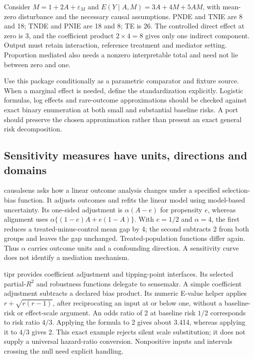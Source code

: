 Consider $M=1+2A+\varepsilon_M$ and
$E(Y\mid A,M)=3A+4M+5AM$, with mean-zero disturbance and the necessary causal
assumptions. PNDE and TNIE are 8 and 18; TNDE and PNIE are 18 and 8; TE is
26. The controlled direct effect at zero is 3, and the coefficient product
$2\times4=8$ gives only one indirect component. Output must retain interaction,
reference treatment and mediator setting. Proportion mediated also needs a
nonzero interpretable total and need not lie between zero and one.
\citep{exec25_rmed_regmedint,exec25_rmed_choice}

Use this package conditionally as a parametric comparator and fixture source.
When a marginal effect is needed, define the standardization explicitly.
Logistic formulas, log effects and rare-outcome approximations should be checked
against exact binary enumeration at both small and substantial baseline risks.
A port should preserve the chosen approximation rather than present an exact
general risk decomposition. \citep{exec25_rmed_choice}

\subsection{Sensitivity measures have units, directions and domains}

causalsens asks how a linear outcome analysis changes under a specified
selection-bias function. It adjusts outcomes and refits the linear model using
model-based uncertainty. Its one-sided adjustment is $\alpha(A-e)$ for
propensity $e$, whereas alignment uses
$\alpha\{(1-e)A+e(1-A)\}$. With $e=1/2$ and $\alpha=4$, the first reduces a
treated-minus-control mean gap by 4; the second subtracts 2 from both groups
and leaves the gap unchanged. Treated-population functions differ again.
Thus $\alpha$ carries outcome units and a confounding direction. A sensitivity
curve does not identify a mediation mechanism. \citep{exec25_rmed_causalsens,exec25_rmed_choice}

tipr provides coefficient adjustment and tipping-point interfaces. Its selected
partial-$R^2$ and robustness functions delegate to sensemakr. A simple coefficient
adjustment subtracts a declared bias product. Its numeric E-value helper applies
$r+\sqrt{r(r-1)}$, after reciprocating an input at or below one, without a
baseline-risk or effect-scale argument. An odds ratio of 2 at baseline risk
$1/2$ corresponds to risk ratio $4/3$. Applying the formula to 2 gives about
3.414, whereas applying it to $4/3$ gives 2. This exact example rejects silent
scale substitution; it does not supply a universal hazard-ratio conversion.
Nonpositive inputs and intervals crossing the null need explicit handling.
\citep{exec25_rmed_tipr,exec25_rmed_choice}


